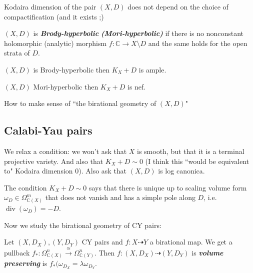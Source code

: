 \begin{thm}[Itaca, 1977]\leavevmode
Kodaira dimension of the pair \((X,D)\) does not depend on the choice of compactification (and it exists ;)
\end{thm}

\begin{defn}[Lu-Zhang, 2017]\leavevmode
\((X,D)\) is \textit{\textbf{Brody-hyperbolic}} \textit{\textbf{(Mori-hyperbolic)}} if there is no nonconstant holomorphic (analytic) morphism  \(f:\mathbb{C} \to X\setminus D\) and the same holds for the open strata of \(D\).
\end{defn}

\begin{conjecture}
\((X,D)\) is Brody-hyperbolic then \(K_X + D\) is ample.
\end{conjecture}

\begin{thm}[Sraldi, 2019]\leavevmode
\((X,D)\) Mori-hyperbolic then \(K_X+D\) is nef.
\end{thm}

\begin{question}\leavevmode
How to make sense of ``the birational geometry of \((X,D)\)"
\end{question}

\subsection{Calabi-Yau pairs}

\begin{defn}\leavevmode
We relax a condition: we won't ask that \(X\) is smooth, but that it is a terminal projective variety. And also that \(K_X+D \sim 0\) (I think this ``would be equivalent to" Kodaira dimension 0). Also ask that \((X,D)\) is log canonica.
\end{defn}

\begin{remark}\leavevmode
The condition \(K_X+D \sim 0\) says that there is unique up to scaling volume form \(\omega_D \in \Omega^m_{\mathbb{C}(X)}\) that does not vanish and has a simple pole along \(D\), i.e.  \(\operatorname{div}(\omega_D)=-D\).
\end{remark}

Now we study the birational geometry of CY pairs:

\begin{defn}\leavevmode
Let \((X,D_X),(Y,D_Y)\) CY pairs and \(f: X \dashrightarrow Y\) a birational map. We get a pullback \(f_*:\Omega^n_{\mathbb{C}(X)}\overset{\cong}{\to} \Omega^n_{\mathbb{C}(Y)}\). Then \(f:(X,D_X) \dashrightarrow (Y,D_Y)\) is \textit{\textbf{volume preserving}} is \(f_*(\omega_{D_X}=\lambda \omega_{D_Y}\).
\end{defn}

